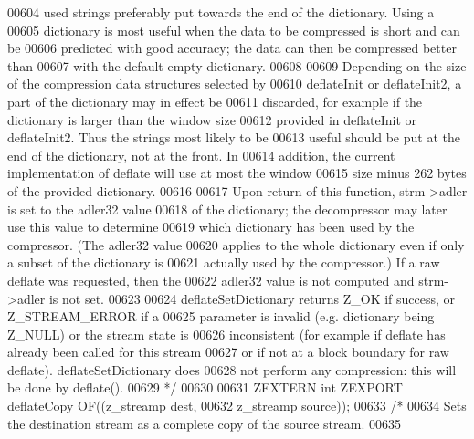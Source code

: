 \begin{DoxyCode}
00604 \textcolor{comment}{   used strings preferably put towards the end of the dictionary.  Using a}
00605 \textcolor{comment}{   dictionary is most useful when the data to be compressed is short and can be}
00606 \textcolor{comment}{   predicted with good accuracy; the data can then be compressed better than}
00607 \textcolor{comment}{   with the default empty dictionary.}
00608 \textcolor{comment}{}
00609 \textcolor{comment}{     Depending on the size of the compression data structures selected by}
00610 \textcolor{comment}{   deflateInit or deflateInit2, a part of the dictionary may in effect be}
00611 \textcolor{comment}{   discarded, for example if the dictionary is larger than the window size}
00612 \textcolor{comment}{   provided in deflateInit or deflateInit2.  Thus the strings most likely to be}
00613 \textcolor{comment}{   useful should be put at the end of the dictionary, not at the front.  In}
00614 \textcolor{comment}{   addition, the current implementation of deflate will use at most the window}
00615 \textcolor{comment}{   size minus 262 bytes of the provided dictionary.}
00616 \textcolor{comment}{}
00617 \textcolor{comment}{     Upon return of this function, strm->adler is set to the adler32 value}
00618 \textcolor{comment}{   of the dictionary; the decompressor may later use this value to determine}
00619 \textcolor{comment}{   which dictionary has been used by the compressor.  (The adler32 value}
00620 \textcolor{comment}{   applies to the whole dictionary even if only a subset of the dictionary is}
00621 \textcolor{comment}{   actually used by the compressor.) If a raw deflate was requested, then the}
00622 \textcolor{comment}{   adler32 value is not computed and strm->adler is not set.}
00623 \textcolor{comment}{}
00624 \textcolor{comment}{     deflateSetDictionary returns Z\_OK if success, or Z\_STREAM\_ERROR if a}
00625 \textcolor{comment}{   parameter is invalid (e.g.  dictionary being Z\_NULL) or the stream state is}
00626 \textcolor{comment}{   inconsistent (for example if deflate has already been called for this stream}
00627 \textcolor{comment}{   or if not at a block boundary for raw deflate).  deflateSetDictionary does}
00628 \textcolor{comment}{   not perform any compression: this will be done by deflate().}
00629 \textcolor{comment}{*/}
00630 
00631 ZEXTERN \textcolor{keywordtype}{int} ZEXPORT deflateCopy OF((z\_streamp dest,
00632                                     z\_streamp source));
00633 \textcolor{comment}{/*}
00634 \textcolor{comment}{     Sets the destination stream as a complete copy of the source stream.}
00635 \textcolor{comment}{}

\end{DoxyCode}
